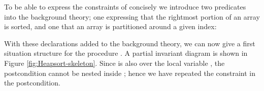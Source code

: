 \documentclass[english,submission]{eptcs}
\newcommand{\procedurelabel}[1]{\small \texttt{#1}}
\newcommand{\situationlabel}[1]{\small \textsc{#1}}
\newcommand{\situationrule}{\vspace{-1.2ex}\mbox{}\rule[1.2ex]{\linewidth}{0.4pt}\mbox{}}
\newcommand{\procedurerule}{\situationrule}
\newcommand{\invariant}[1]{\small \ensuremath{\mathtt{#1}}}
\newcommand{\declaration}[1]{\small \ensuremath{\mathtt{#1}}}
\newcommand{\ibpid}[1]{\texttt{#1}}
\newcommand{\ibpkw}[1]{\textsf{\textbf{#1}}}
\begin{document}
To be able to express the constraints of  concisely
we introduce two predicates into the background theory; one expressing
that the rightmost portion of an array is sorted, and one that an
array is partitioned around a given index:
\begin{quote}

\end{quote}
\noindent With these declarations added to the background theory,
we can now give a first situation structure for the procedure .
A partial invariant diagram is shown in Figure \ref{fig:Heapsort-skeleton}.
Since  is also over the local variable ,
the postcondition cannot be nested inside ;
hence we have repeated the constraint  in
the postcondition.

\begin{figure}
\noindent \begin{centering}
\end{centering}
\end{figure}
\end{document}
